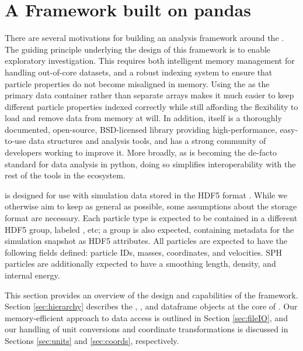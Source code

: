 \section{A Framework built on pandas}
\label{sec:framework}

There are several motivations for building an analysis framework around the . 
The guiding principle underlying the design of this framework is to enable exploratory investigation.
This requires both intelligent memory management for handling out-of-core datasets, and a robust indexing system to ensure that particle properties do not become misaligned in memory.
Using  the  as the primary data container rather than separate  arrays makes it much easier to keep different particle properties indexed correctly while still affording the flexibility to load and remove data from memory at will.
In addition,  itself is a thoroughly documented, open-source, BSD-licensed library providing high-performance, easy-to-use data structures and analysis tools, and has a strong community of developers working to improve it.  
More broadly, as  is becoming the de-facto standard for data analysis in python, doing so simplifies interoperability with the rest of the tools in the ecosystem.

 is designed for use with simulation data stored in the HDF5 format \citep{hdf5}.  
While we otherwise aim to keep  as general as possible, some assumptions about the storage format are necessary.
Each particle type is expected to be contained in a different HDF5 group, labeled , etc; a  group is also expected, containing metadata for the simulation snapshot as HDF5 attributes. 
All particles are expected to have the following fields defined: particle IDs, masses, coordinates, and velocities.  
SPH particles are additionally expected to have a smoothing length, density, and internal energy.  

This section provides an overview of the design and capabilities of the  framework.  
Section \ref{sec:hierarchy} describes the , , and  dataframe objects at the core of .  
Our memory-efficient approach to data access is outlined in Section \ref{sec:fileIO}, and our handling of unit conversions and coordinate transformations is discussed in Sections \ref{sec:units} and \ref{sec:coords}, respectively.
